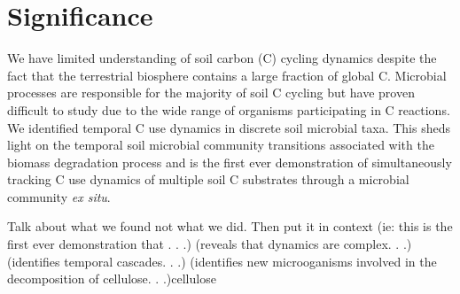\section{Significance} 
We have limited understanding of soil carbon (C) cycling dynamics despite the fact that the terrestrial biosphere contains a large fraction of global C. Microbial processes are responsible for the majority of soil C cycling but have proven difficult to study due to the wide range of organisms participating in C reactions. We identified temporal C use dynamics in discrete soil microbial taxa. This sheds light on the temporal soil microbial community transitions associated with the biomass degradation process and is the first ever demonstration of simultaneously tracking C use dynamics of multiple soil C substrates through a microbial community \textit{ex situ}.   

    

Talk about what we found not what we did. Then put it in context (ie: this is the first ever demonstration that . . .) (reveals that dynamics are complex. . .) (identifies temporal cascades. . .) (identifies new microoganisms involved in the decomposition of cellulose. . .)cellulose